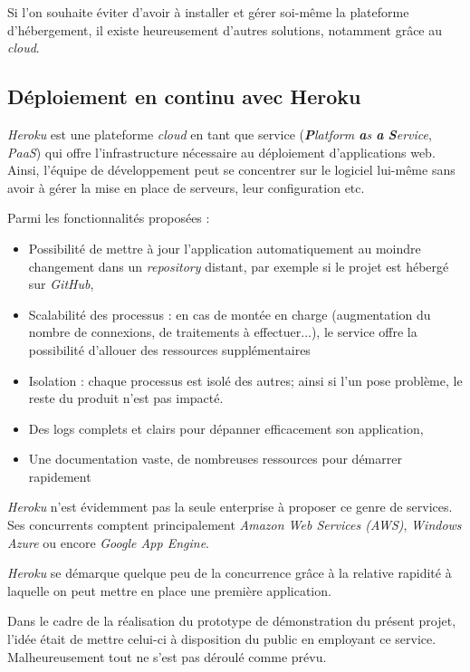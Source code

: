Si l'on souhaite éviter d'avoir à installer et gérer soi-même la plateforme d'hébergement, il existe heureusement d'autres solutions, notamment grâce au \textit{cloud}.

\subsection{Déploiement en continu avec Heroku}

\textit{Heroku} est une plateforme \textit{cloud} en tant que service (\textit{\textbf{P}latform \textbf{a}s \textbf{a} \textbf{S}ervice}, \textit{PaaS}) qui offre l'infrastructure nécessaire au déploiement d'applications web. Ainsi, l'équipe de développement peut se concentrer sur le logiciel lui-même sans avoir à gérer la mise en place de serveurs, leur configuration etc.

Parmi les fonctionnalités proposées :
\begin{itemize}
    \item Possibilité de mettre à jour l'application automatiquement au moindre changement dans un \textit{repository} distant, par exemple si le projet est hébergé sur \textit{GitHub},
    \item Scalabilité des processus : en cas de montée en charge (augmentation du nombre de connexions, de traitements à effectuer...), le service offre la possibilité d'allouer des ressources supplémentaires
    \item Isolation : chaque processus est isolé des autres; ainsi si l'un pose problème, le reste du produit n'est pas impacté.
    \item Des logs complets et clairs pour dépanner efficacement son application,
    \item Une documentation vaste, de nombreuses ressources pour démarrer rapidement
\end{itemize}


\textit{Heroku} n'est évidemment pas la seule enterprise à proposer ce genre de services. Ses concurrents comptent principalement \textit{Amazon Web Services (AWS)}, \textit{Windows Azure} ou encore \textit{Google App Engine}.

\textit{Heroku} se démarque quelque peu de la concurrence grâce à la relative rapidité à laquelle on peut mettre en place une première application.

Dans le cadre de la réalisation du prototype de démonstration du présent projet, l'idée était de mettre celui-ci à disposition du public en employant ce service. Malheureusement tout ne s'est pas déroulé comme prévu.

